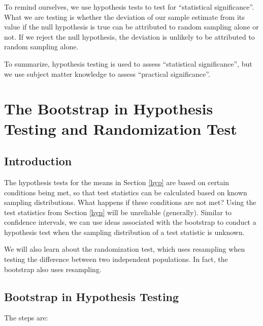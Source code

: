 \documentclass[
]{book}
\theoremstyle{definition}
\theoremstyle{definition}
\theoremstyle{definition}
\theoremstyle{definition}
\theoremstyle{remark}
\begin{document}
To remind ourselves, we use hypothesis tests to test for ``statistical significance''. What we are testing is whether the deviation of our sample estimate from its value if the null hypothesis is true can be attributed to random sampling alone or not. If we reject the null hypothesis, the deviation is unlikely to be attributed to random sampling alone.

To summarize, hypothesis testing is used to assess ``statistical significance'', but we use subject matter knowledge to assess ``practical significance''.

\hypertarget{randomtest}{%
\chapter{The Bootstrap in Hypothesis Testing and Randomization Test}\label{randomtest}}

\hypertarget{introduction-6}{%
\section{Introduction}\label{introduction-6}}

The hypothesis tests for the means in Section \ref{hyp} are based on certain conditions being met, so that test statistics can be calculated based on known sampling distributions. What happens if these conditions are not met? Using the test statistics from Section \ref{hyp} will be unreliable (generally). Similar to confidence intervals, we can use ideas associated with the bootstrap to conduct a hypothesis test when the sampling distribution of a test statistic is unknown.

We will also learn about the randomization test, which uses resampling when testing the difference between two independent populations. In fact, the bootstrap also uses resampling.

\hypertarget{bootstrap-in-hypothesis-testing}{%
\section{Bootstrap in Hypothesis Testing}\label{bootstrap-in-hypothesis-testing}}

The steps are:
\end{document}
